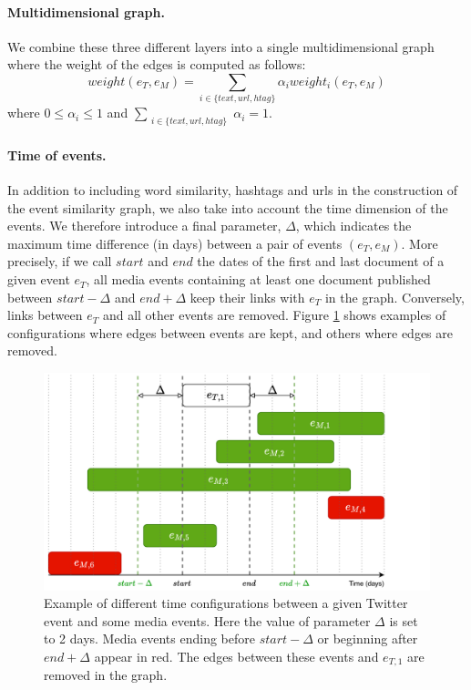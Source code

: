 \paragraph{Multidimensional graph.} We combine these three different layers into a single multidimensional graph where the weight of the edges is computed as follows:
\begin{equation}
    weight(e_T, e_M) = \sum_{i \in \{text, url, htag\}} \alpha_i weight_i(e_T, e_M)
\end{equation}
where $0 \leq \alpha_i \leq 1$ and $\sum\limits_{\substack{i \in \{text, url, htag\}}}{\alpha_i = 1}$.

\paragraph{Time of events.} In addition to including word similarity, hashtags and urls in the construction of the event similarity graph, we also take into account the time dimension of the events. We therefore introduce a final parameter, $\Delta$, which indicates the maximum time difference (in days) between a pair of events $(e_T, e_M)$. More precisely, if we call $start$ and $end$ the dates of the first and last document of a given event $e_T$, all media events containing at least one document published between $start - \Delta$ and $end + \Delta$ keep their links with $e_T$ in the graph. Conversely, links between $e_T$ and all other events are removed. Figure \ref{fig:event_time} shows examples of configurations where edges between events are kept, and others where edges are removed.
 \begin{figure}
 \begin{center}
      \includegraphics[]{figures/event_time.pdf}
    \caption[Example of different time configurations between a given Twitter event and some media events]{Example of different time configurations between a given Twitter event and some media events. Here the value of parameter $\Delta$ is set to 2 days. Media events ending before $start - \Delta$ or beginning after $end + \Delta$ appear in red. The edges between these events and $e_{T,1}$ are removed in the graph.}
    \label{fig:event_time}
 \end{center}
\end{figure}

